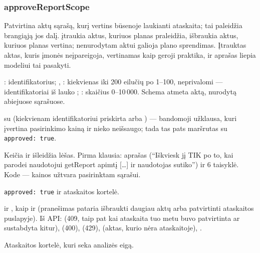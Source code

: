 \subsubsection{approveReportScope}\label{sec:tools:approveReportScope}
\begin{description}[style=multiline, leftmargin=19mm, labelwidth=17mm, labelsep=2mm,
  font=\sffamily\bfseries\footnotesize\color{ink}, itemsep=1pt, topsep=2pt, before=\raggedright]
  \item[Paskirtis] Patvirtina aktų sąrašą, kurį vertins būsenoje  laukianti
    ataskaita; tai paleidžia brangiąją jos dalį.  įtraukia aktus, kuriuos planas
    praleidžia,  išbraukia aktus, kuriuos planas vertina; nenurodytam aktui galioja
    plano sprendimas. Įtrauktas aktas, kuris įmonės neįpareigoja, vertinamas kaip geroji praktika, ir
    aprašas liepia modeliui tai pasakyti.
  \item[Įvestis] : identifikatorius; , : kiekvienas iki
    200 eilučių po 1--100, neprivalomi --- identifikatoriai iš  lauko
    ; : skaičius 0--10\,000. Schema atmeta aktą, nurodytą
    abiejuose sąrašuose.
  \item[Užklausos]  su  (kiekvienam
    identifikatoriui priskirta  arba ) --- bandomoji užklausa, kuri įvertina
    pasirinkimo kainą ir nieko neišsaugo; tada tas pats maršrutas su \texttt{approved: true}.
  \item[Pobūdis] Keičia ir išleidžia lėšas. Pirma klausia: aprašas (\enquote{Iškviesk jį TIK
    po to, kai parodei naudotojui getReport apimtį […] ir naudotojas sutiko}) ir 6 taisyklė.
    Kode --- kainos užtvara pasirinktam sąrašui.
  \item[Grąžina] \texttt{approved: true} ir ataskaitos kortelė.
  \item[Klaidos]  ir , kaip ir
     (pranešimas pataria išbraukti daugiau aktų arba patvirtinti
    ataskaitos puslapyje). Iš API:  (409, taip pat kai ataskaita tuo metu
    buvo patvirtinta ar sustabdyta kitur),  (400),
     (429),  (aktas, kurio nėra ataskaitoje),
    .
  \item[Konsolė] Ataskaitos kortelė, kuri seka analizės eigą.
\end{description}

